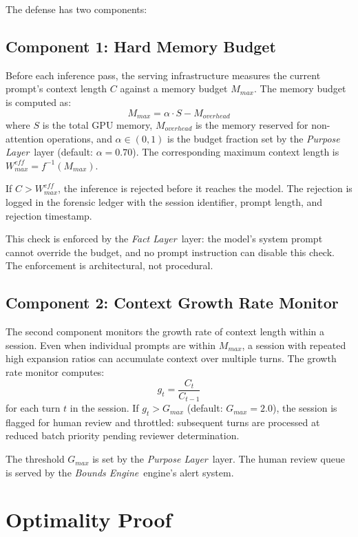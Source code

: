 \documentclass[12pt]{article}
\newcommand{\purpose}{\textit{Purpose Layer}}
\newcommand{\bounds}{\textit{Bounds Engine}}
\newcommand{\fact}{\textit{Fact Layer}}
\begin{document}
The defense has two components:

\subsection{Component 1: Hard Memory Budget}
Before each inference pass, the serving infrastructure measures the current prompt's context length $C$ against a memory budget $M_{max}$. The memory budget is computed as:
\begin{equation}
M_{max} = \alpha \cdot S - M_{overhead}
\label{eq:memory-budget}
\end{equation}
where $S$ is the total GPU memory, $M_{overhead}$ is the memory reserved for non-attention operations, and $\alpha \in (0, 1)$ is the budget fraction set by the \purpose\ layer (default: $\alpha = 0.70$). The corresponding maximum context length is $W_{max}^{eff} = f^{-1}(M_{max})$.

If $C > W_{max}^{eff}$, the inference is rejected before it reaches the model. The rejection is logged in the forensic ledger with the session identifier, prompt length, and rejection timestamp.

This check is enforced by the \fact\ layer: the model's system prompt cannot override the budget, and no prompt instruction can disable this check. The enforcement is architectural, not procedural.

\subsection{Component 2: Context Growth Rate Monitor}
The second component monitors the growth rate of context length within a session. Even when individual prompts are within $M_{max}$, a session with repeated high expansion ratios can accumulate context over multiple turns. The growth rate monitor computes:
\begin{equation}
g_t = \frac{C_t}{C_{t-1}}
\label{eq:growth-rate}
\end{equation}
for each turn $t$ in the session. If $g_t > G_{max}$ (default: $G_{max} = 2.0$), the session is flagged for human review and throttled: subsequent turns are processed at reduced batch priority pending reviewer determination.

The threshold $G_{max}$ is set by the \purpose\ layer. The human review queue is served by the \bounds\ engine's alert system.

\section{Optimality Proof}
\label{sec:optimality}
\end{document}
